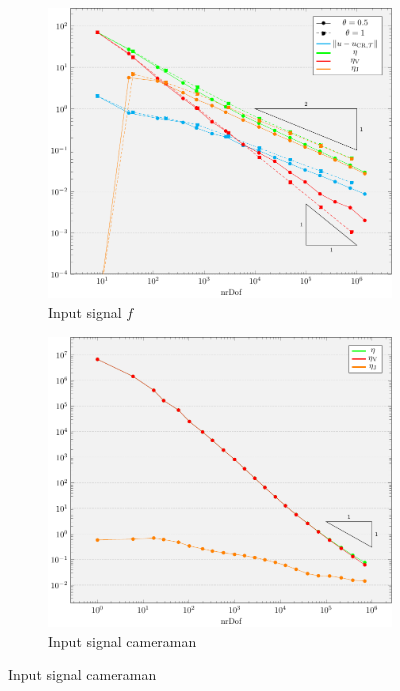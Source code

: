 \begin{frame}
  \begin{figure}[!ht]
    \centering
    \begin{subfigure}{.49\linewidth}
      \caption*{Input signal $f$}
      \includegraphics[width=\linewidth]
        {pictures/experiments/refIndGlebConvergence/f01/convergenceEtaError.pdf}
    \end{subfigure}
    \begin{subfigure}{.49\linewidth}
      \caption*{Input signal cameraman}
      \includegraphics[width=\linewidth]
        {pictures/experiments/refIndGlebConvergence/cam/convergenceEta.pdf}
    \end{subfigure}
  \end{figure}


\end{frame}
